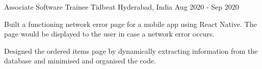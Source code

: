 \begin{cventries}
\cventry
    {Associate Software Trainee} %
    {Tidbeat} %
    {Hyderabad, India} %
    {Aug 2020 - Sep 2020} %
    {
      \begin{cvitems} %
        \item {Built a functioning network error page for a mobile app using React Native. The page would be
displayed to the user in case a network error occurs.}
        \item {Designed the ordered items page by dynamically extracting information from the database and
minimised and organised the code.}
      \end{cvitems}
    }

\end{cventries}
